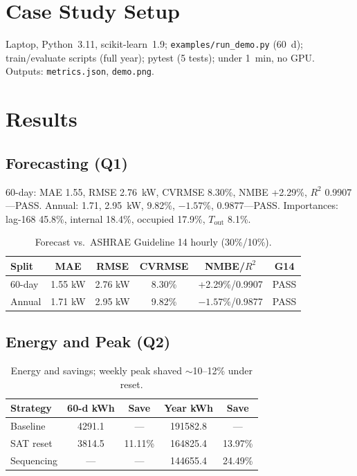 \documentclass[conference, letterpaper, 10pt]{IEEEtran}
\begin{document}
\section{Case Study Setup}
Laptop, Python~3.11, scikit-learn~1.9; \texttt{examples/run\_demo.py} (60~d); train/evaluate scripts (full year); pytest (5 tests); under 1~min, no GPU. Outputs: \texttt{metrics.json}, \texttt{demo.png}.

\section{Results}
\subsection{Forecasting (Q1)}
60-day: MAE 1.55, RMSE 2.76~kW, CVRMSE 8.30\%, NMBE +2.29\%, $R^2$ 0.9907---PASS. Annual: 1.71, 2.95~kW, 9.82\%, $-1.57\%$, 0.9877---PASS. Importances: lag-168 45.8\%, internal 18.4\%, occupied 17.9\%, $T_{\mathrm{out}}$ 8.1\%.

\begin{table}[htbp]
\caption{Forecast vs.\ ASHRAE Guideline 14 hourly (30\%/10\%).}
\label{tab:forecast}
\centering
\begin{tabular}{lccccc}
\toprule
Split & MAE & RMSE & CVRMSE & NMBE/$R^2$ & G14 \\
\midrule
60-day & 1.55 kW & 2.76 kW & 8.30\% & +2.29\%/0.9907 & PASS \\
Annual & 1.71 kW & 2.95 kW & 9.82\% & $-1.57\%$/0.9877 & PASS \\
\bottomrule
\end{tabular}
\end{table}

\subsection{Energy and Peak (Q2)}
\begin{table}[htbp]
\caption{Energy and savings; weekly peak shaved $\sim$10--12\% under reset.}
\label{tab:energy}
\centering
\begin{tabular}{lcccc}
\toprule
Strategy & 60-d kWh & Save & Year kWh & Save \\
\midrule
Baseline & 4291.1 & --- & 191582.8 & --- \\
SAT reset & 3814.5 & 11.11\% & 164825.4 & 13.97\% \\
Sequencing & --- & --- & 144655.4 & 24.49\% \\
\bottomrule
\end{tabular}
\end{table}
\end{document}

